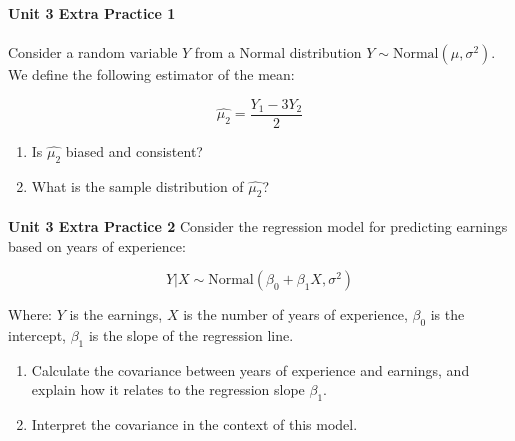 \textbf{Unit 3 Extra Practice 1}  
\paragraph{}
Consider a random variable \(Y\) from a Normal distribution \( Y \sim \text{Normal}(\mu, \sigma^2) \). We define the following estimator of the mean:

\[
\hat{\mu_2} = \frac{Y_1 - 3Y_2}{2}
\]

\begin{enumerate}
  \item[(a)] Is \( \hat{\mu_2} \) biased and consistent?  
  \item[(b)] What is the sample distribution of \( \hat{\mu_2} \)?
\end{enumerate}

\paragraph{}

\textbf{Unit 3 Extra Practice 2}  
Consider the regression model for predicting earnings based on years of experience:

\[
Y | X \sim \text{Normal}(\beta_0 + \beta_1 X, \sigma^2)
\]

Where:  
 \( Y \) is the earnings,  
 \( X \) is the number of years of experience,  
 \( \beta_0 \) is the intercept,  
 \( \beta_1 \) is the slope of the regression line.

\begin{enumerate}
  \item[(a)] Calculate the covariance between years of experience and earnings, and explain how it relates to the regression slope \( \beta_1 \).  
  \item[(b)] Interpret the covariance in the context of this model.
\end{enumerate}



 
 



